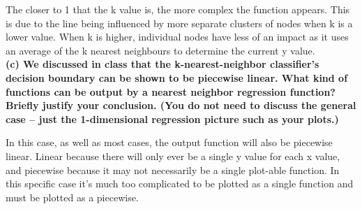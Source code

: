 \documentclass[]{report}   %
\begin{document}
The closer to 1 that the k value is, the more complex the function appears. This is due to the line being influenced by more separate clusters of nodes when k is a lower value. When k is higher, individual nodes have less of an impact as it uses an average of the k nearest neighbours to determine the current y value.
\newline
~\\
{\bf (c) We discussed in class that the k-nearest-neighbor classifier’s decision boundary can be shown to be piecewise linear. What kind of functions can be output by a nearest neighbor regression function? Briefly justify your conclusion. (You do not need to discuss the general case – just the 1-dimensional regression picture such as your plots.)}
\newline

In this case, as well as most cases, the output function will also be piecewise linear. Linear because there will only ever be a single y value for each x value, and piecewise because it may not necessarily be a single plot-able function. In this specific case it's much too complicated to be plotted as a single function and must be plotted as a piecewise.
\end{document}
